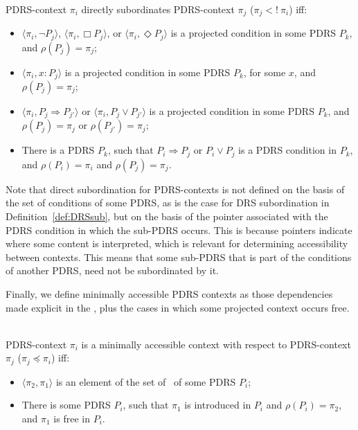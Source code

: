 \begin{definition}~\\
PDRS-context $\pi_i$ directly subordinates PDRS-context $\pi_j$ 
($\pi_j <!~\pi_i$) iff:
  \begin{itemize}
    \item $\langle\pi_i,\neg P_j\rangle$,
      $\langle\pi_i,\Box P_j\rangle$,
      or $\langle\pi_i,\Diamond P_j\rangle$ is a projected condition in
      some PDRS $P_k$, and $\rho(P_j) = \pi_j$;
    \item $\langle\pi_i,x:P_j\rangle$ is a projected condition in some
      PDRS $P_k$, for some $x$, and $\rho(P_j) = \pi_j$;
    \item  $\langle\pi_i,P_j \Rightarrow P_{j'}\rangle$ or
      $\langle\pi_i,P_j \vee P_{j'}\rangle$ is a projected condition in
      some PDRS $P_k$, and $\rho(P_j) = \pi_j$ or $\rho(P_{j'}) = \pi_j$;
    \item There is a PDRS $P_k$, such that $P_i \Rightarrow P_j$ or 
      $P_i \vee P_j$ is a PDRS condition in $P_k$, and $\rho(P_i) = \pi_i$ 
      and $\rho(P_j) = \pi_j$. 
  \end{itemize}
\end{definition}

\noindent Note that direct subordination for PDRS-contexts is not defined on
the basis of the set of conditions of some PDRS, as is the case for DRS
subordination in Definition~\ref{def:DRSsub}, but on the basis of the
pointer associated with the PDRS condition in which the sub-PDRS occurs.
This is because pointers indicate where some content is interpreted, which
is relevant for determining accessibility between contexts. This means that
some sub-PDRS that is part of the conditions of another PDRS, need not be
subordinated by it. 

Finally, we define minimally accessible PDRS contexts as those dependencies
made explicit in the \MAPs, plus the cases in which some projected context
occurs free.

\begin{definition}~\\
PDRS-context $\pi_i$ is a minimally accessible context with
respect to PDRS-context $\pi_j$ ($\pi_j \preceq \pi_i$) iff:
  \begin{itemize}
    \item $\langle \pi_2,\pi_1\rangle$ is an element of the set of
      \MAPs~of some PDRS $P_i$;
    \item There is some PDRS $P_i$, such that $\pi_1$ is introduced in $P_i$
      and $\rho(P_i)=\pi_2$, and $\pi_1$ is free in $P_i$. 
  \end{itemize}
\end{definition}


